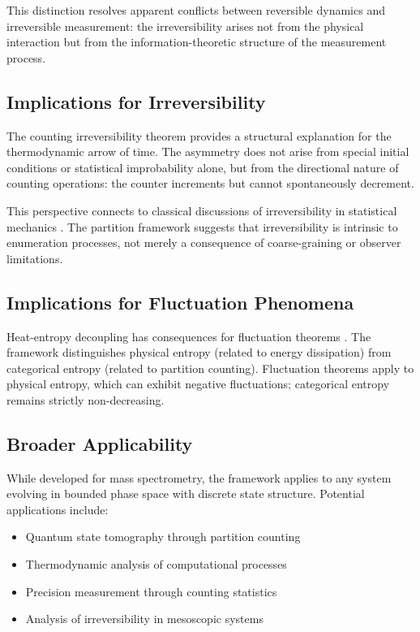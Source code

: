 \documentclass[twocolumn,10pt]{article}
\begin{document}
This distinction resolves apparent conflicts between reversible dynamics and irreversible measurement: the irreversibility arises not from the physical interaction but from the information-theoretic structure of the measurement process.

\subsection{Implications for Irreversibility}

The counting irreversibility theorem provides a structural explanation for the thermodynamic arrow of time. The asymmetry does not arise from special initial conditions or statistical improbability alone, but from the directional nature of counting operations: the counter increments but cannot spontaneously decrement.

This perspective connects to classical discussions of irreversibility in statistical mechanics \citep{boltzmann1877, lebowitz1993}. The partition framework suggests that irreversibility is intrinsic to enumeration processes, not merely a consequence of coarse-graining or observer limitations.

\subsection{Implications for Fluctuation Phenomena}

Heat-entropy decoupling has consequences for fluctuation theorems \citep{jarzynski1997, crooks1999}. The framework distinguishes physical entropy (related to energy dissipation) from categorical entropy (related to partition counting). Fluctuation theorems apply to physical entropy, which can exhibit negative fluctuations; categorical entropy remains strictly non-decreasing.

\subsection{Broader Applicability}

While developed for mass spectrometry, the framework applies to any system evolving in bounded phase space with discrete state structure. Potential applications include:

\begin{itemize}
    \item Quantum state tomography through partition counting
    \item Thermodynamic analysis of computational processes
    \item Precision measurement through counting statistics
    \item Analysis of irreversibility in mesoscopic systems
\end{itemize}
\end{document}

